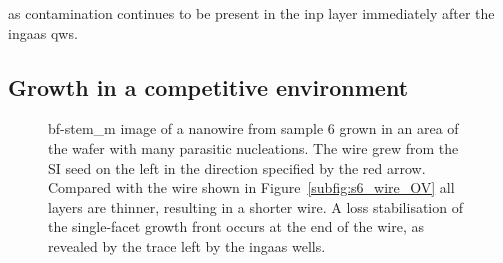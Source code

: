 \Acl{as} contamination continues to be present in the \acs{inp} layer immediately after the \acs{ingaas} \acl{qw}s.

\subsection{Growth in a competitive environment}
\label{sec:competitive}

\begin{figure}
    \centering
    \caption[\acs{bf}-\acs{stem_m} image of a nanowire from sample 6 grown in an area of the wafer with many parasitic nucleations.]{\acs{bf}-\acs{stem_m} image of a nanowire from sample 6 grown in an area of the wafer with many parasitic nucleations. The wire grew from the \acs{SI} seed on the left in the direction specified by the red arrow. Compared with the wire shown in Figure~\ref{subfig:s6_wire_OV} all layers are thinner, resulting in a shorter wire. A loss stabilisation of the  single-facet growth front occurs at the end of the wire, as revealed by the trace left by the \acs{ingaas} wells.}
    \label{fig:s6_competitive_OV}
\end{figure}

